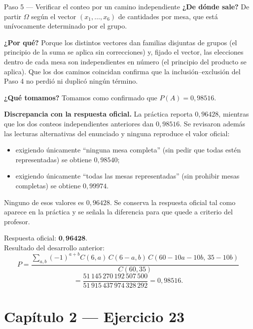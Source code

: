 \documentclass[11pt]{article}
\begin{document}
\begin{sol}
\begin{paso}{Paso 5 --- Verificar el conteo por un camino independiente}
\textbf{¿De d\'onde sale?} De partir $\Omega$ seg\'un el vector $(x_1,\dots,x_6)$ de cantidades por mesa, que est\'a un\'ivocamente determinado por el grupo.

\textbf{¿Por qu\'e?} Porque los distintos vectores dan familias disjuntas de grupos (el principio de la suma se aplica sin correcciones) y, fijado el vector, las elecciones dentro de cada mesa son independientes en n\'umero (el principio del producto se aplica). Que los dos caminos coincidan confirma que la inclusi\'on--exclusi\'on del Paso 4 no perdi\'o ni duplic\'o ning\'un t\'ermino.

\textbf{¿Qu\'e tomamos?} Tomamos como confirmado que $P(A)=0{,}98516$.
\end{paso}

\begin{nota}
\textbf{Discrepancia con la respuesta oficial.} La pr\'actica reporta $0{,}96428$, mientras que los dos conteos independientes anteriores dan $0{,}98516$. Se revisaron adem\'as las lecturas alternativas del enunciado y ninguna reproduce el valor oficial:
\begin{itemize}[leftmargin=*]
  \item exigiendo \'unicamente ``ninguna mesa completa'' (sin pedir que todas est\'en representadas) se obtiene $0{,}98540$;
  \item exigiendo \'unicamente ``todas las mesas representadas'' (sin prohibir mesas completas) se obtiene $0{,}99974$.
\end{itemize}
Ninguno de esos valores es $0{,}96428$. Se conserva la respuesta oficial tal como aparece en la pr\'actica y se se\~nala la diferencia para que quede a criterio del profesor.
\end{nota}

\end{sol}

\begin{resp}
Respuesta oficial: $\mathbf{0{,}96428}$.\\
Resultado del desarrollo anterior:
\[
P=\frac{\sum_{a,b}(-1)^{a+b}C(6,a)\,C(6-a,b)\,C(60-10a-10b,\,35-10b)}{C(60,35)}
\]
\[
=\frac{51\,145\,270\,192\,507\,500}{51\,915\,437\,974\,328\,292}=0{,}98516 .
\]
\end{resp}

\section*{Cap\'itulo 2 --- Ejercicio 23}
\end{document}
